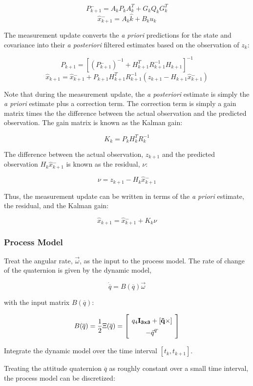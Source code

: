 \documentclass{article}
\newcommand{\mat}[2][ccccccccccccccccccccccccccccccccccccccccccccc]{\left[
        \arraycolsep=4pt\def\arraystretch{1.5}
        \begin{array}{#1} #2 \\ 
        \end{array} 
        \right]}
\begin{document}
\begin{flushleft}
$$ P{^{-}_{k+1}} = A_k P_k A_k^{T} + G_k Q_k G_k^{T} $$
$$ \hat{x}{^{-}_{k+1}} = A_k \hat{k} + B_k u_k $$

The measurement update converts the \textit{a priori} predictions for the state and covariance into their \textit{a posteriori} filtered estimates based on the observation of $z_k$: 

$$ P_{k+1} = [ (P{^{-}_{k+1}})^{-1} + H_{k+1}^{T} R_{k+1}^{-1} H_{k+1} ]^{-1} $$
$$ \hat{x}_{k+1} = \hat{x}{^{-}_{k+1}} + P_{k+1} H_{k+1}^{T} R_{k+1}^{-1} (z_{k+1} - H_{k+1} \hat{x}{^{-}_{k+1}}) $$

Note that during the measurement update, the \textit{a posteriori} estimate is simply the \textit{a priori} estimate plus a correction term. The correction term is simply a gain matrix times the the difference between the actual observation and the predicted observation. The gain matrix is known as the Kalman gain: 

$$ K_k = P_k H_k^{T} R_k^{-1} $$

The difference between the actual observation, $z_{k+1}$ and the predicted observation $H_k \hat{x}{^-_{k+1}}$ is known as the residual, $\nu$:

$$ \nu = z_{k+1} - H_k \hat{x}{^-_{k+1}} $$

Thus, the measurement update can be written in terms of the \textit{a priori} estimate, the residual, and the Kalman gain:

$$ \hat{x}_{k+1} = \hat{x}{^-_{k+1}} + K_k \nu $$

\subsubsection{Process Model}

Treat the angular rate, $\vec{\omega}$, as the input to the process model. The rate of change of the quaternion is given by the dynamic model, 

\[ \dot{\overline{q}} = B(\overline{q}) \vec{\omega} \]

with the input matrix $B(\overline{q})$: 

\[ B(\overline{q}) = \frac{1}{2} \Xi(\overline{q}) = \mat{q_4 \bf{I}_{3x3} + [\vec{q}\times] \\ -\vec{q}^T } \]

Integrate the dynamic model over the time interval $[t_k, t_{k+1}]$. 

Treating the attitude quaternion $\overline{q}$ as roughly constant over a small time interval, the process model can be discretized: 


\end{flushleft}
\end{document}
